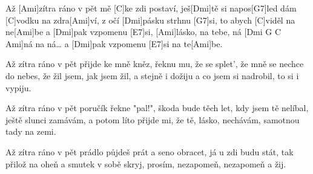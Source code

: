
\sloka
Až [Ami]zítra ráno v pět mě [C]ke zdi postaví,
ješ[Dmi]tě si napos[G7]led dám [C]vodku na zdra[Ami]ví,
z očí [Dmi]pásku strhnu [G7]si, to abych [C]viděl na ne[Ami]be
a [Dmi]pak vzpomenu [E7]si, [Ami]lásko, na tebe,
ná [Dmi G C Ami]ná na ná…
a [Dmi]pak vzpomenu [E7]si na te[Ami]be.

\sloka
Až zítra ráno v pět přijde ke mně kněz,
řeknu mu, že se splet’, že mně se nechce do nebes,
že žil jsem, jak jsem žil, a stejně i dožiju
a co jsem si nadrobil, to si i vypiju.

\sloka
Až zítra ráno v pět poručík řekne "pal!",
škoda bude těch let, kdy jsem tě nelíbal,
ještě slunci zamávám, a potom líto přijde mi,
že tě, lásko, nechávám, samotnou tady na zemi.

\sloka
Až zítra ráno v pět prádlo půjdeš prát
a seno obracet, já u zdi budu stát,
tak přilož na oheň a smutek v sobě skryj,
prosím, nezapomeň, nezapomeň a žij.
